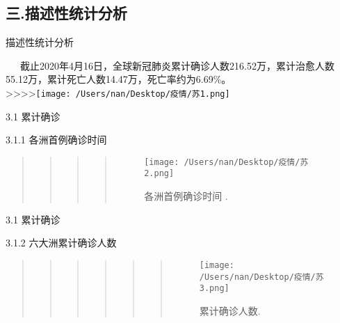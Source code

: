 \documentclass[
  ignorenonframetext,
]{beamer}
\begin{document}
\hypertarget{section-14}{%
\subsection{三.描述性统计分析}\label{section-14}}

\begin{frame}{描述性统计分析}
\protect\hypertarget{section-15}{}

  截止2020年4月16日，全球新冠肺炎累计确诊人数216.52万，累计治愈人数55.12万，累计死亡人数14.47万，死亡率约为6.69\%。\\
\textgreater\textgreater\textgreater\textgreater{}\texttt{[image: /Users/nan/Desktop/疫情/苏1.png]}

\end{frame}

\begin{frame}{3.1 累计确诊}
\protect\hypertarget{section-16}{}

\begin{block}{3.1.1 各洲首例确诊时间}

\begin{quote}
\begin{quote}
\begin{quote}
\begin{quote}
\begin{figure}
\centering
\texttt{[image: /Users/nan/Desktop/疫情/苏2.png]}
\caption{各洲首例确诊时间 .}
\end{figure}
\end{quote}
\end{quote}
\end{quote}
\end{quote}

\end{block}

\end{frame}

\begin{frame}{3.1 累计确诊}
\protect\hypertarget{section-18}{}

\begin{block}{3.1.2 六大洲累计确诊人数}

\begin{quote}
\begin{quote}
\begin{quote}
\begin{quote}
\begin{quote}
\begin{quote}
\begin{figure}
\centering
\texttt{[image: /Users/nan/Desktop/疫情/苏3.png]}
\caption{累计确诊人数.}
\end{figure}
\end{quote}
\end{quote}
\end{quote}
\end{quote}
\end{quote}
\end{quote}

\end{block}

\end{frame}
\end{document}
